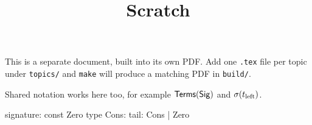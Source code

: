 \documentclass[11pt]{article}
\title{Scratch}
\author{}
\date{}
\begin{document}
\maketitle

This is a separate document, built into its own PDF. Add one \texttt{.tex} file
per topic under \texttt{topics/} and \texttt{make} will produce a matching PDF
in \texttt{build/}.

Shared notation works here too, for example $\mathsf{Terms}(\mathsf{Sig})$ and $\sigma(t_{\mathrm{left}})$.

\begin{rrscode}
signature:
    const Zero
    type Cons:
        tail: Cons | Zero
\end{rrscode}
\end{document}
